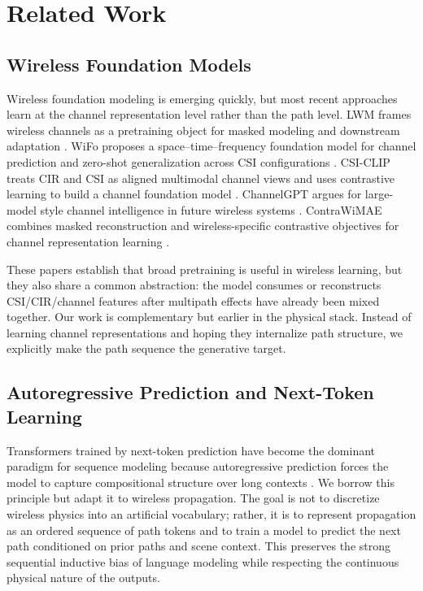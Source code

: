 \documentclass[11pt]{article}
\begin{document}
\section{Related Work}
\subsection{Wireless Foundation Models}
Wireless foundation modeling is emerging quickly, but most recent approaches learn at the channel representation level rather than the path level. LWM frames wireless channels as a pretraining object for masked modeling and downstream adaptation \cite{lwm}. WiFo proposes a space--time--frequency foundation model for channel prediction and zero-shot generalization across CSI configurations \cite{wifo}. CSI-CLIP treats CIR and CSI as aligned multimodal channel views and uses contrastive learning to build a channel foundation model \cite{csiclip}. ChannelGPT argues for large-model style channel intelligence in future wireless systems \cite{channelgpt}. ContraWiMAE combines masked reconstruction and wireless-specific contrastive objectives for channel representation learning \cite{contrawimae}.

These papers establish that broad pretraining is useful in wireless learning, but they also share a common abstraction: the model consumes or reconstructs CSI/CIR/channel features after multipath effects have already been mixed together. Our work is complementary but earlier in the physical stack. Instead of learning channel representations and hoping they internalize path structure, we explicitly make the path sequence the generative target.

\subsection{Autoregressive Prediction and Next-Token Learning}
Transformers trained by next-token prediction have become the dominant paradigm for sequence modeling because autoregressive prediction forces the model to capture compositional structure over long contexts \cite{vaswani,gpt3}. We borrow this principle but adapt it to wireless propagation. The goal is not to discretize wireless physics into an artificial vocabulary; rather, it is to represent propagation as an ordered sequence of path tokens and to train a model to predict the next path conditioned on prior paths and scene context. This preserves the strong sequential inductive bias of language modeling while respecting the continuous physical nature of the outputs.
\end{document}
